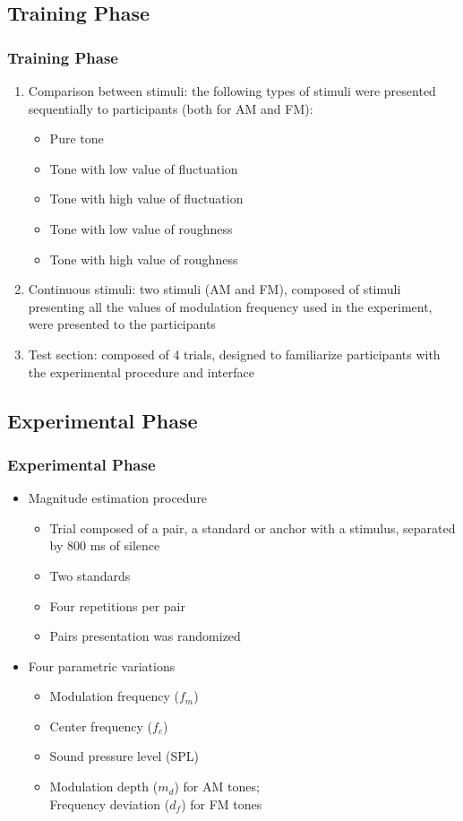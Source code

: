 \documentclass{beamer}
\begin{document}
\subsection{Training Phase}
\begin{frame}
  \frametitle{Training Phase}
  \begin{enumerate}
    \item Comparison between stimuli: the following types of stimuli were
      presented sequentially to participants (both for AM and FM):
      \begin{itemize}
        \item Pure tone
        \item Tone with low value of fluctuation
        \item Tone with high value of fluctuation
        \item Tone with low value of roughness
        \item Tone with high value of roughness
      \end{itemize}
    \pause{}
    \item Continuous stimuli: two stimuli (AM and FM), composed of stimuli
      presenting all the values of modulation frequency used in the experiment,
      were presented to the participants
    \pause{}
    \item Test section: composed of 4 trials, designed to familiarize
      participants with the experimental procedure and interface
  \end{enumerate}
\end{frame}

\subsection{Experimental Phase}
\begin{frame}
  \frametitle{Experimental Phase}
  \begin{itemize}
    \item Magnitude estimation procedure
    \begin{itemize}
      \item Trial composed of a pair, a standard or anchor with a stimulus,
        separated by 800 ms of silence
      \item Two standards
      \item Four repetitions per pair
      \item Pairs presentation was randomized
    \end{itemize}
    \pause{}
    \item Four parametric variations
    \begin{itemize}
      \item Modulation frequency ($f_m$)
      \item Center frequency ($f_c$)
      \item Sound pressure level (SPL)
      \item Modulation depth ($m_d$) for AM tones;\\Frequency deviation ($d_f$)
        for FM tones
    \end{itemize}
  \end{itemize}
\end{frame}
\end{document}
